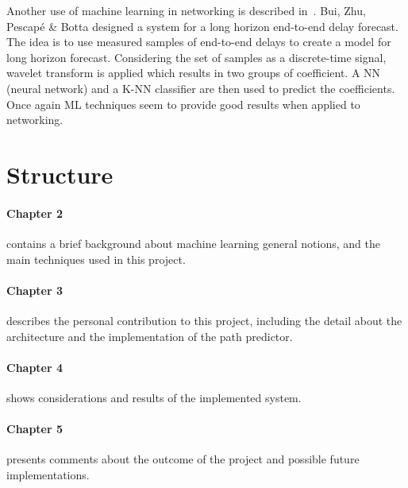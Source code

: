 Another use of machine learning in networking is described in~\cite{end-to-end}. Bui, Zhu, Pescapé \& Botta designed a system for a long horizon end-to-end delay forecast. The idea is to use measured samples of end-to-end delays to create a model for long horizon forecast. Considering the set of samples as a discrete-time signal, wavelet transform is applied which results in two groups of coefficient. A NN (neural network) and a K-NN classifier are then used to predict the coefficients. Once again ML techniques seem to provide good results when applied to networking.

\section{Structure}
\paragraph{Chapter 2} contains a brief background about machine learning general notions, and the main techniques used in this project.
\paragraph{Chapter 3} describes the personal contribution to this project, including the detail about the architecture and the implementation of the path predictor.
\paragraph{Chapter 4} shows considerations and results of the implemented system.
\paragraph{Chapter 5} presents comments about the outcome of the project and possible future implementations.

